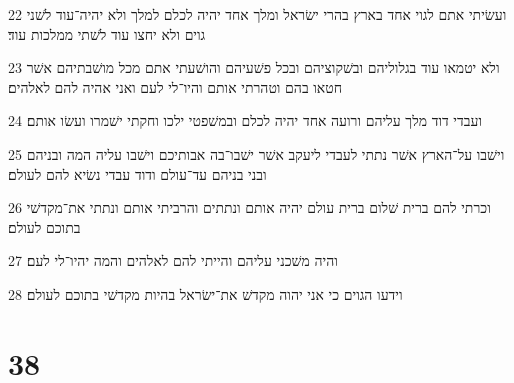 \par 22 ועשׂיתי אתם לגוי אחד בארץ בהרי ישׂראל ומלך אחד יהיה לכלם למלך ולא יהיה־עוד לשׁני גוים ולא יחצו עוד לשׁתי ממלכות עוד׃
\par 23 ולא יטמאו עוד בגלוליהם ובשׁקוציהם ובכל פשׁעיהם והושׁעתי אתם מכל מושׁבתיהם אשׁר חטאו בהם וטהרתי אותם והיו־לי לעם ואני אהיה להם לאלהים׃
\par 24 ועבדי דוד מלך עליהם ורועה אחד יהיה לכלם ובמשׁפטי ילכו וחקתי ישׁמרו ועשׂו אותם׃
\par 25 וישׁבו על־הארץ אשׁר נתתי לעבדי ליעקב אשׁר ישׁבו־בה אבותיכם וישׁבו עליה המה ובניהם ובני בניהם עד־עולם ודוד עבדי נשׂיא להם לעולם׃
\par 26 וכרתי להם ברית שׁלום ברית עולם יהיה אותם ונתתים והרביתי אותם ונתתי את־מקדשׁי בתוכם לעולם׃
\par 27 והיה משׁכני עליהם והייתי להם לאלהים והמה יהיו־לי לעם׃
\par 28 וידעו הגוים כי אני יהוה מקדשׁ את־ישׂראל בהיות מקדשׁי בתוכם לעולם׃

\chapter{38}

